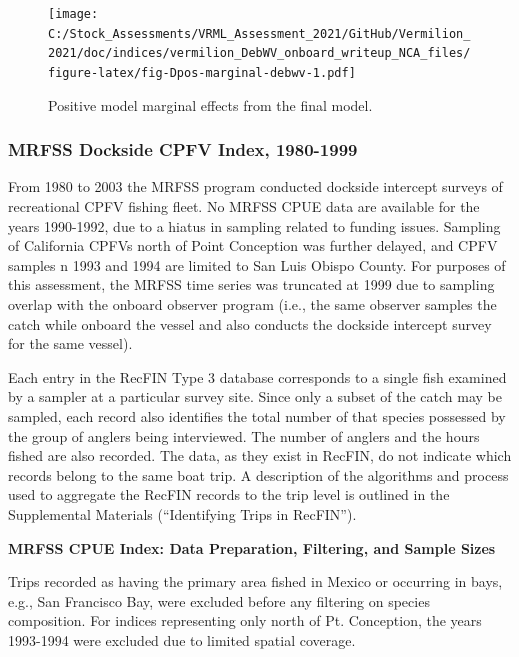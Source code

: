 \documentclass[11pt,
  english,
  a4paper,
]{article}
\begin{document}
\begin{figure}
\centering
\texttt{[image: C:/Stock\_Assessments/VRML\_Assessment\_2021/GitHub/Vermilion\_2021/doc/indices/vermilion\_DebWV\_onboard\_writeup\_NCA\_files/figure-latex/fig-Dpos-marginal-debwv-1.pdf]}
\caption{\label{fig:fig-Dpos-marginal-debwv}Positive model marginal effects from the final model.}
\end{figure}


\hypertarget{mrfss-dockside-cpfv-index-1980-1999}{%
\subsubsection{MRFSS Dockside CPFV Index, 1980-1999}\label{mrfss-dockside-cpfv-index-1980-1999}}

\leavevmode\tagmcend\tagstructend

From 1980 to 2003 the MRFSS program conducted dockside intercept surveys of recreational CPFV fishing fleet. No MRFSS CPUE data are available for the years 1990-1992, due to a hiatus in sampling related to funding issues. Sampling of California CPFVs north of Point Conception was further delayed, and CPFV samples n 1993 and 1994 are limited to San Luis Obispo County. For purposes of this assessment, the MRFSS time series was truncated at 1999 due to sampling overlap with the onboard observer program (i.e., the same observer samples the catch while onboard the vessel and also conducts the dockside intercept survey for the same vessel).

Each entry in the RecFIN Type 3 database corresponds to a single fish examined by a sampler at a particular survey site. Since only a subset of the catch may be sampled, each record also identifies the total number of that species possessed by the group of anglers being interviewed. The number of anglers and the hours fished are also recorded. The data, as they exist in RecFIN, do not indicate which records belong to the same boat trip. A description of the algorithms and process used to aggregate the RecFIN records to the trip level is outlined in the Supplemental Materials (``Identifying Trips in RecFIN'').

\textbf{MRFSS CPUE Index: Data Preparation, Filtering, and Sample Sizes}

Trips recorded as having the primary area fished in Mexico or occurring in bays, e.g., San Francisco Bay, were excluded before any filtering on species composition. For indices representing only north of Pt. Conception, the years 1993-1994 were excluded due to limited spatial coverage.
\end{document}
